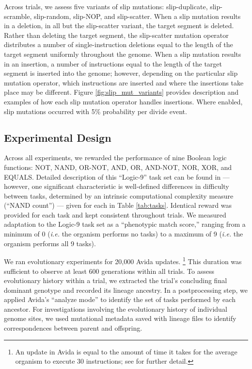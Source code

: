 Across trials, we assess five variants of slip mutations: slip-duplicate, slip-scramble, slip-random, slip-NOP, and slip-scatter.
When a slip mutation results in a deletion, in all but the slip-scatter variant, the target segment is deleted. Rather than deleting the target segment, the slip-scatter mutation operator distributes a number of single-instruction deletions equal to the length of the target segment uniformly throughout the genome.
When a slip mutation results in an insertion, a number of instructions equal to the length of the target segment is inserted into the genome; however, depending on the particular slip mutation operator, which instructions are inserted and where the insertions take place may be different.
Figure \ref{fig:slip_mut_variants} provides description and examples of how each slip mutation operator handles insertions.
Where enabled, slip mutations occurred with 5\% probability per divide event.

\subsection{Experimental Design}



Across all experiments, we rewarded the performance of nine Boolean logic functions: NOT, NAND, OR-NOT, AND, OR, AND-NOT, NOR, XOR, and EQUALS.
Detailed description of this ``Logic-9'' task set can be found in \citet{lenski2003evolutionary} ---
however, one significant characteristic is well-defined differences in difficulty between tasks, determined by an intrinsic computational complexity measure (``NAND count'') --- given for each in Table \ref{tab:tasks}.
Identical reward was provided for each task and kept consistent throughout trials.
We measured adaptation to the Logic-9 task set as a ``phenotypic match score,'' ranging from a minimum of 0 (\textit{i.e.} the organism performs no tasks) to a maximum of 9 (\textit{i.e.} the organism performs all 9 tasks).

We ran evolutionary experiments for 20,000 Avida updates.%
\footnote{An update in Avida is equal to the amount of time it takes for the average organism to execute 30 instructions; see \citep{Ofria:2009avida} for further detail.}
This duration was sufficient to observe at least 600 generations within all trials.
To assess evolutionary history within a trial, we extracted the trial's concluding final dominant genotype and recorded its lineage ancestry.
In a postprocessing step, we applied Avida's ``analyze mode'' to identify the set of tasks performed by each ancestor.
For investigations involving the evolutionary history of individual genome sites, we used mutational metadata saved with lineage files to identify correspondences between parent and offspring.

